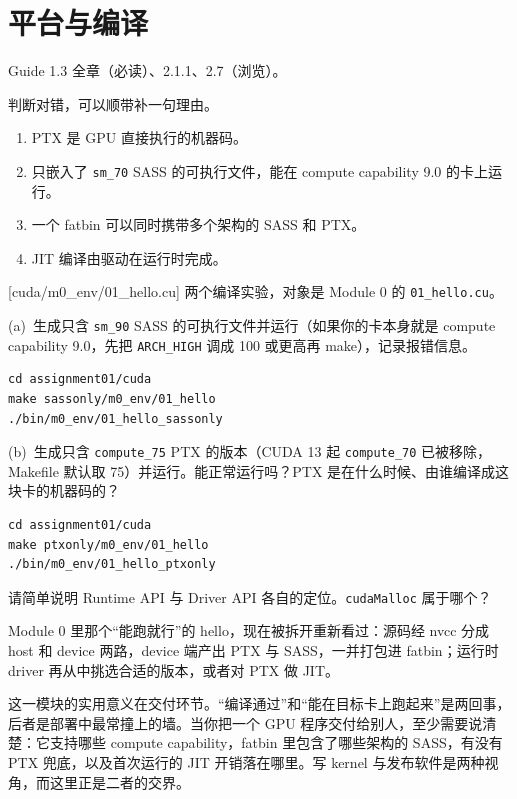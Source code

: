 \documentclass[11pt,a4paper,fontset=windows]{ctexart}
\begin{document}
\section{平台与编译}

\begin{reading}
Guide 1.3 全章（必读）、2.1.1、2.7（浏览）。
\end{reading}

判断对错，可以顺带补一句理由。
\begin{enumerate}[label=(\alph*)]
  \item PTX 是 GPU 直接执行的机器码。
  \item 只嵌入了 \texttt{sm\_70} SASS 的可执行文件，能在 compute capability 9.0 的卡上运行。
  \item 一个 fatbin 可以同时携带多个架构的 SASS 和 PTX。
  \item JIT 编译由驱动在运行时完成。
\end{enumerate}

[cuda/m0\_env/01\_hello.cu]
两个编译实验，对象是 Module 0 的 \texttt{01\_hello.cu}。

(a)~生成只含 \texttt{sm\_90} SASS 的可执行文件并运行（如果你的卡本身就是 compute capability 9.0，先把 \texttt{ARCH\_HIGH} 调成 100 或更高再 make），记录报错信息。

\begin{lstlisting}
cd assignment01/cuda
make sassonly/m0_env/01_hello
./bin/m0_env/01_hello_sassonly
\end{lstlisting}

(b)~生成只含 \texttt{compute\_75} PTX 的版本（CUDA 13 起 \texttt{compute\_70} 已被移除，Makefile 默认取 75）并运行。能正常运行吗？PTX 是在什么时候、由谁编译成这块卡的机器码的？

\begin{lstlisting}
cd assignment01/cuda
make ptxonly/m0_env/01_hello
./bin/m0_env/01_hello_ptxonly
\end{lstlisting}

请简单说明 Runtime API 与 Driver API 各自的定位。\texttt{cudaMalloc} 属于哪个？

\begin{lookback}
Module 0 里那个“能跑就行”的 hello，现在被拆开重新看过：源码经 nvcc 分成 host 和 device 两路，device 端产出 PTX 与 SASS，一并打包进 fatbin；运行时 driver 再从中挑选合适的版本，或者对 PTX 做 JIT。

这一模块的实用意义在交付环节。“编译通过”和“能在目标卡上跑起来”是两回事，后者是部署中最常撞上的墙。当你把一个 GPU 程序交付给别人，至少需要说清楚：它支持哪些 compute capability，fatbin 里包含了哪些架构的 SASS，有没有 PTX 兜底，以及首次运行的 JIT 开销落在哪里。写 kernel 与发布软件是两种视角，而这里正是二者的交界。
\end{lookback}
\end{document}
